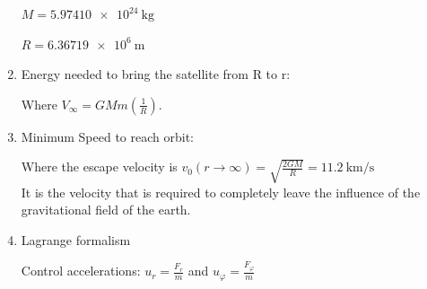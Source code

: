 \documentclass[10pt,a4paper]{scrartcl}
\begin{document}
\begin{multicols*}{3}
\begin{enumerate}
$M=\SI{5.97410e24}{\kilo\gram}$

$R=\SI{6.36719e6}{\meter}$

\item Energy needed to bring the satellite from R to r:



Where $V_\infty=GMm(\frac{1}{R})$.

\item Minimum Speed to reach orbit:



Where the escape velocity is $v_0(r\rightarrow\infty)=\sqrt{\frac{2GM}{R}}=\SI{11.2}{\kilo\meter\per\second}$ \\
It is the velocity that is required to completely leave the influence of the gravitational field of the earth.

\item Lagrange formalism





Control accelerations: $u_r=\frac{F_r}{m}$ and $u_\varphi=\frac{F_\varphi}{m}$


\end{enumerate}
\end{multicols*}
\end{document}
